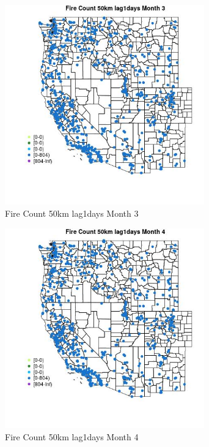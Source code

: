 \begin{figure} 
\centering  
\includegraphics[width=0.77\textwidth]{Code_Outputs/Report_ML_input_PM25_Step4_part_f_de_duplicated_aves_prioritize_24hr_obswNAs_MapObsMo3Fire_Count_50km_lag1days.jpg} 
\caption{\label{fig:Report_ML_input_PM25_Step4_part_f_de_duplicated_aves_prioritize_24hr_obswNAsMapObsMo3Fire_Count_50km_lag1days}Fire Count 50km lag1days Month 3} 
\end{figure} 
 

\begin{figure} 
\centering  
\includegraphics[width=0.77\textwidth]{Code_Outputs/Report_ML_input_PM25_Step4_part_f_de_duplicated_aves_prioritize_24hr_obswNAs_MapObsMo4Fire_Count_50km_lag1days.jpg} 
\caption{\label{fig:Report_ML_input_PM25_Step4_part_f_de_duplicated_aves_prioritize_24hr_obswNAsMapObsMo4Fire_Count_50km_lag1days}Fire Count 50km lag1days Month 4} 
\end{figure} 
 

